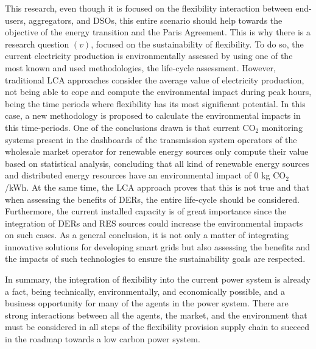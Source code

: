 This research, even though it is focused on the flexibility interaction between end-users, aggregators, and DSOs, this entire scenario should help towards the objective of the energy transition and the Paris Agreement. This is why there is a research question $(v)$, focused on the sustainability of flexibility. To do so, the current electricity production is environmentally assessed by using one of the most known and used methodologies, the life-cycle assessment. However, traditional LCA approaches consider the average value of electricity production, not being able to cope and compute the environmental impact during peak hours, being the time periods where flexibility has its most significant potential. In this case, a new methodology is proposed to calculate the environmental impacts in this time-periods. One of the conclusions drawn is that current CO$_2$ monitoring systems present in the dashboards of the transmission system operators of the wholesale market operator for renewable energy sources only compute their value based on statistical analysis, concluding that all kind of renewable energy sources and distributed energy resources have an environmental impact of 0 kg CO$_2$/kWh. At the same time, the LCA approach proves that this is not true and that when assessing the benefits of DERs, the entire life-cycle should be considered. Furthermore, the current installed capacity is of great importance since the integration of DERs and RES sources could increase the environmental impacts on such cases. As a general conclusion, it is not only a matter of integrating innovative solutions for developing smart grids but also assessing the benefits and the impacts of such technologies to ensure the sustainability goals are respected. 

In summary, the integration of flexibility into the current power system is already a fact, being technically, environmentally, and economically possible, and a business opportunity for many of the agents in the power system. There are strong interactions between all the agents, the market, and the environment that must be considered in all steps of the flexibility provision supply chain to succeed in the roadmap towards a low carbon power system. 
     
